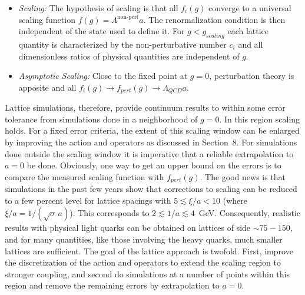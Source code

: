 \begin{itemize}
  \item \textit{Scaling:} The hypothesis of scaling is that all $f_i(g)$
    converge to a universal scaling function $f(g) = \Lambda^{\mathrm{non}\text{-}\mathrm{pert}} a$.
    The renormalization condition is then independent of the state used to
    define it. For $g < g_{scaling}$ each lattice quantity is characterized
    by the non-perturbative number $c_i$ and all dimensionless ratios of
    physical quantities are independent of $g$.
  \item \textit{Asymptotic Scaling:} Close to the fixed point at $g = 0$,
    perturbation theory is apposite and all $f_i(g) \to f_{pert}(g) \to
    \Lambda_{QCD} a$.
\end{itemize}

Lattice simulations, therefore, provide continuum results to within some
error tolerance from simulations done in a neighborhood of $g = 0$. In this
region scaling holds. For a fixed error criteria, the extent of this scaling
window can be enlarged by improving the action and operators as discussed
in Section~8. For simulations done outside the
scaling window it is imperative that a reliable extrapolation to $a = 0$ be
done. Obviously, one way to get an upper bound on the errors is to compare
the measured scaling function with $f_{pert}(g)$. The good news is that
simulations in the past few years show that corrections to scaling can be
reduced to a few percent level for lattice spacings with
$5 \lesssim \xi/a < 10$ (where $\xi/a = 1/(\sqrt{\sigma}\,a)$). This
corresponds to $2 \lesssim 1/a \lesssim 4$~GeV. Consequently, realistic
results with physical light quarks can be obtained on lattices of side
$\sim 75 - 150$, and for many quantities, like those involving the heavy
quarks, much smaller lattices are sufficient. The goal of the lattice
approach is twofold. First, improve the discretization of the action and
operators to extend the scaling region to stronger coupling, and second do
simulations at a number of points within this region and remove the
remaining errors by extrapolation to $a = 0$.

